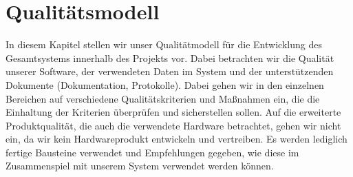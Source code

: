 \chapter{Qualitätsmodell}

In diesem Kapitel stellen wir unser Qualitätmodell für die Entwicklung des Gesamtsystems innerhalb des Projekts vor. Dabei betrachten wir die Qualität unserer Software, der verwendeten Daten im System und der unterstützenden Dokumente (Dokumentation, Protokolle). Dabei gehen wir in den einzelnen Bereichen auf verschiedene Qualitätskriterien und Maßnahmen ein, die die Einhaltung der Kriterien überprüfen und sicherstellen sollen. Auf die erweiterte Produktqualität, die auch die verwendete Hardware betrachtet, gehen wir nicht ein, da wir kein Hardwareprodukt entwickeln und vertreiben. Es werden lediglich fertige Bausteine verwendet und Empfehlungen gegeben, wie diese im Zusammenspiel mit unserem System verwendet werden können.






